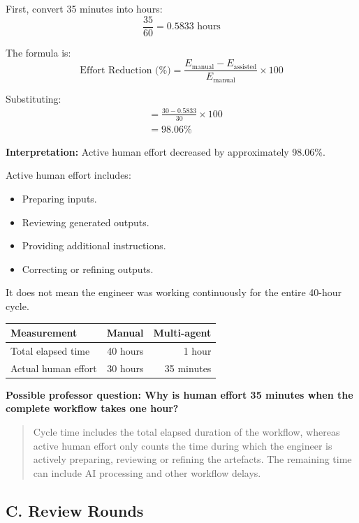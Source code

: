 \documentclass[11pt,a4paper]{article}
\begin{document}
First, convert 35 minutes into hours:
\[
\frac{35}{60}=0.5833\text{ hours}
\]

The formula is:
\[
\text{Effort Reduction (\%)} =
\frac{E_{\text{manual}}-E_{\text{assisted}}}
     {E_{\text{manual}}}\times 100
\]

Substituting:
\[
\begin{aligned}
&= \frac{30-0.5833}{30}\times 100\\
&= \boxed{98.06\%}
\end{aligned}
\]

\textbf{Interpretation:} Active human effort decreased by approximately 98.06\%.

Active human effort includes:
\begin{itemize}
  \item Preparing inputs.
  \item Reviewing generated outputs.
  \item Providing additional instructions.
  \item Correcting or refining outputs.
\end{itemize}

It does not mean the engineer was working continuously for the entire 40-hour cycle.

\begin{center}
\begin{tabular}{lrr}
\toprule
\textbf{Measurement} & \textbf{Manual} & \textbf{Multi-agent}\\
\midrule
Total elapsed time & 40 hours & 1 hour\\
Actual human effort & 30 hours & 35 minutes\\
\bottomrule
\end{tabular}
\end{center}

\textbf{Possible professor question: Why is human effort 35 minutes when the complete workflow takes one hour?}

\begin{quote}
Cycle time includes the total elapsed duration of the workflow, whereas active human effort only counts the time during which the engineer is actively preparing, reviewing or refining the artefacts. The remaining time can include AI processing and other workflow delays.
\end{quote}

\subsection{C. Review Rounds}
\end{document}
